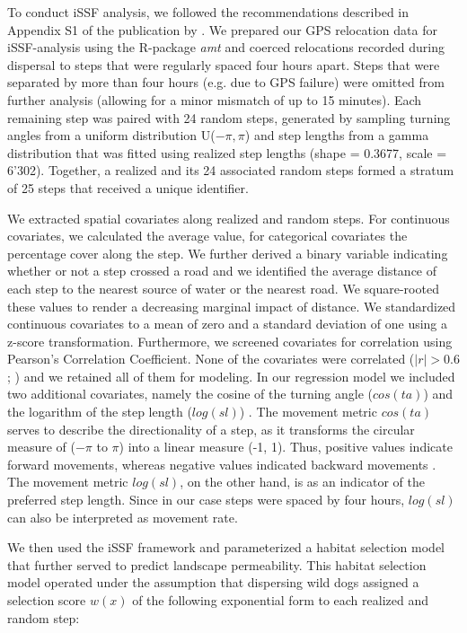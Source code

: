 \documentclass[abstract=off,10pt,a4paper,bibliography=totocnumbered]{article}
\begin{document}
To conduct iSSF analysis, we followed the recommendations described in Appendix
S1 of the publication by \cite{Avgar.2016}. We prepared our GPS relocation data
for iSSF-analysis using the R-package \textit{amt} \citep{Amt.2019} and coerced
relocations recorded during dispersal to steps that were regularly spaced four
hours apart. Steps that were separated by more than four hours (e.g. due to GPS
failure) were omitted from further analysis (allowing for a minor mismatch of up
to 15 minutes). Each remaining step was paired with 24 random steps, generated
by sampling turning angles from a uniform distribution U(\(-\pi, \pi\)) and step
lengths from a gamma distribution that was fitted using realized step lengths
(shape = 0.3677, scale = 6'302). Together, a realized and its 24 associated
random steps formed a stratum of 25 steps that received a unique identifier.

We extracted spatial covariates along realized and random steps. For continuous
covariates, we calculated the average value, for categorical covariates the
percentage cover along the step. We further derived a binary variable indicating
whether or not a step crossed a road and we identified the average distance of
each step to the nearest source of water or the nearest road. We square-rooted
these values to render a decreasing marginal impact of distance. We standardized
continuous covariates to a mean of zero and a standard deviation of one using a
z-score transformation. Furthermore, we screened covariates for correlation
using Pearson's Correlation Coefficient. None of the covariates were correlated
(\(|r| > 0.6\); \citealp{Latham.2011}) and we retained all of them for modeling.
In our regression model we included two additional covariates, namely the cosine
of the turning angle (\(cos(ta)\)) and the logarithm of the step length
(\(log(sl)\)) \citep{Avgar.2016}. The movement metric \(cos(ta)\) serves to
describe the directionality of a step, as it transforms the circular measure of
(\(-\pi\) to \(\pi\)) into a linear measure (-1, 1). Thus, positive values
indicate forward movements, whereas negative values indicated backward movements
\citep{Turchin.1998}. The movement metric \(log(sl)\), on the other hand, is as
an indicator of the preferred step length. Since in our case steps were spaced
by four hours, \(log(sl)\) can also be interpreted as movement rate.

We then used the iSSF framework and parameterized a habitat selection model that
further served to predict landscape permeability. This habitat selection model
operated under the assumption that dispersing wild dogs assigned a selection
score \(w(x)\) of the following exponential form to each realized and random
step:
\end{document}
